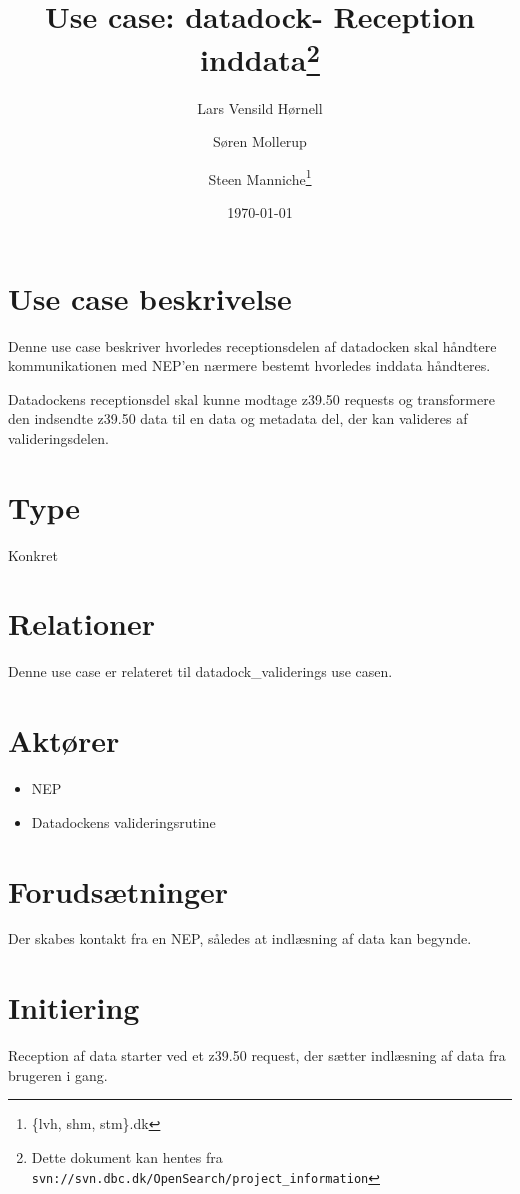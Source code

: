 \documentclass{article}
\author{Lars Vensild Hørnell \and Søren Mollerup \and Steen
  Manniche\thanks{\{lvh, shm, stm\}\@dbc.dk}}
\date{\today}
\title{Use case: datadock- Reception inddata\thanks{Dette dokument kan hentes fra \texttt{svn://svn.dbc.dk/OpenSearch/project\_information}}}
\begin{document}
\maketitle

\newpage

\tableofcontents

\section{Use case beskrivelse}

Denne use case beskriver hvorledes receptionsdelen af datadocken skal
håndtere kommunikationen med NEP'en nærmere bestemt hvorledes inddata
håndteres.

Datadockens receptionsdel skal kunne modtage z39.50 requests og
transformere den indsendte z39.50 data til en data og metadata del,
der kan valideres af valideringsdelen.

\section{Type}
Konkret

\section{Relationer}

Denne use case er relateret til datadock\_validerings use casen.

\section{Aktører}

\begin{itemize}
\item NEP
\item Datadockens valideringsrutine
\end{itemize}

\section{Forudsætninger}
Der skabes kontakt fra en NEP, således at indlæsning af data kan begynde. 

\section{Initiering}
Reception af data starter ved et z39.50 request, der sætter indlæsning
af data fra brugeren i gang.
\end{document}
